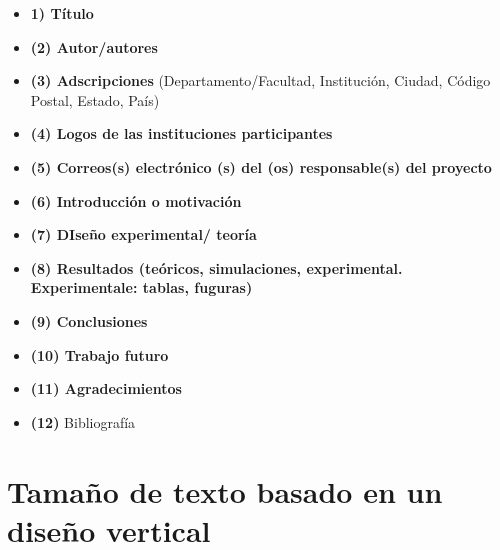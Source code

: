 \documentclass{article}
\begin{document}
\begin{itemize}
	\item \textbf{1) Título}\\
	\item \textbf{(2) Autor/autores}\\
	\item \textbf{(3) Adscripciones} (Departamento/Facultad, Institución, Ciudad, Código Postal, Estado, País)\\
	\item  \textbf{(4) Logos de las instituciones participantes}\\
	\item \textbf{ (5) Correos(s) electrónico (s) del (os) responsable(s) del proyecto}\\
	\item \textbf{(6) Introducción o motivación}\\
	\item \textbf{(7) DIseño experimental/ teoría}\\
	\item \textbf{(8) Resultados (teóricos, simulaciones, experimental. Experimentale: tablas, fuguras)}\\
	\item \textbf{(9) Conclusiones}\\
	\item \textbf{(10) Trabajo futuro}\\
	\item \textbf{(11) Agradecimientos}\\
	\item \textbf{(12)} Bibliografía
\end{itemize} \vspace{0.5cm}


 \section{\textcolor{Tarawera}{\textbf{Tamaño de texto basado en un diseño vertical}}} \vspace{0.5cm}
 
 
\end{document}
